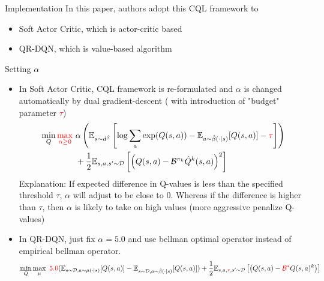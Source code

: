 \documentclass[11pt]{beamer}
\newcommand{\mbb}[1]{\mathbb{#1}}
\newcommand{\mc}[1]{\mathcal{#1}}
\begin{document}
\begin{frame}{Implementation}
  In this paper, authors adopt this CQL framework to
  \begin{itemize}
    \item Soft Actor Critic, which is actor-critic based
    \item QR-DQN, which is value-based algorithm
  \end{itemize}
  
  \begin{block}{Setting $\alpha$}
    \begin{itemize}
      \item In Soft Actor Critic, CQL framework is re-formulated and $\alpha$ is changed automatically by dual gradient-descent ( with introduction of "budget" parameter \textcolor{red}{$\tau$})
      \[
      \begin{aligned}
        \min_Q \textcolor{red}{\max_{\alpha \geq 0}}\  &\alpha \left( \mbb{E}_{s \sim d^{\hat{\beta}}} \left[\log \sum_a \exp(Q(s,a))- \mbb{E}_{a \sim \hat{\beta}(\cdot|s)} [Q(s,a)] - \textcolor{red}{\tau} \right] \right) \\
        &+ \frac{1}{2} \mbb{E}_{s,a,s^\prime \sim \mc{D}} \left[\left( Q(s,a) - \mc{B}^{\pi_k} \hat{Q}^k(s,a)\right)^2 \right]
      \end{aligned}
      \]
      Explanation: If expected difference in Q-values is less than the specified threshold $\tau$, $\alpha$ will adjust to be close to $0$.
      Whereas if the difference is higher than $\tau$, then $\alpha$ is likely to take on high values (more aggressive penalize Q-values) 
      \item In QR-DQN, just fix $\alpha = 5.0$ and use bellman optimal operator instead of empirical bellman operator.
      \[
        \min_Q \max_\mu \ \textcolor{red}{5.0} (\mbb{E}_{s \sim \mc{D}, a \sim \mu(\cdot|s)}[Q(s,a)] - \mbb{E}_{s \sim \mc{D}, a \sim \hat{\beta}(\cdot |s)}[Q(s,a)]) + \frac{1}{2} \mbb{E}_{s,a,\textcolor{red}{r},s^\prime  \sim \mc{D}}\left[\left(  Q(s,a) - \textcolor{red}{\mc{B}^\ast} Q(s,a)^{k}\right)\right]
      \]
    \end{itemize}
  \end{block}
\end{frame}
\end{document}
